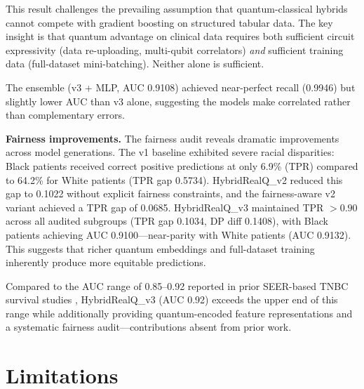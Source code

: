 \documentclass[12pt, letterpaper]{article}
\begin{document}
This result challenges the prevailing assumption that quantum-classical hybrids cannot compete with gradient boosting on structured tabular data. The key insight is that quantum advantage on clinical data requires both sufficient circuit expressivity (data re-uploading, multi-qubit correlators) \textit{and} sufficient training data (full-dataset mini-batching). Neither alone is sufficient.

The ensemble (v3 + MLP, AUC 0.9108) achieved near-perfect recall (0.9946) but slightly lower AUC than v3 alone, suggesting the models make correlated rather than complementary errors.

\textbf{Fairness improvements.} The fairness audit reveals dramatic improvements across model generations. The v1 baseline exhibited severe racial disparities: Black patients received correct positive predictions at only 6.9\% (TPR) compared to 64.2\% for White patients (TPR gap 0.5734). HybridRealQ\_v2 reduced this gap to 0.1022 without explicit fairness constraints, and the fairness-aware v2 variant achieved a TPR gap of 0.0685. HybridRealQ\_v3 maintained TPR $> 0.90$ across all audited subgroups (TPR gap 0.1034, DP diff 0.1408), with Black patients achieving AUC 0.9100---near-parity with White patients (AUC 0.9132). This suggests that richer quantum embeddings and full-dataset training inherently produce more equitable predictions.

Compared to the AUC range of 0.85--0.92 reported in prior SEER-based TNBC survival studies \citep{huang2022, qiu2024}, HybridRealQ\_v3 (AUC 0.92) exceeds the upper end of this range while additionally providing quantum-encoded feature representations and a systematic fairness audit---contributions absent from prior work.


\section{Limitations}
\end{document}
